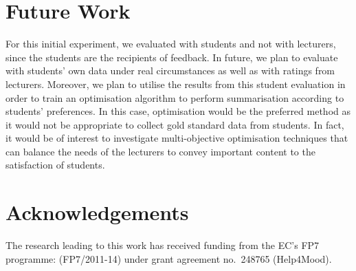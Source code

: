 \documentclass[11pt]{article}
\begin{document}
%




\section{Future Work} \label{futureWork} 

For this initial experiment, we evaluated with students and not with lecturers, since 
the students are the recipients of feedback. In future, we plan to evaluate with students' own 
data under real circumstances as well as with ratings from lecturers. 
Moreover, we plan to utilise the results from this student evaluation in order to train 
an optimisation algorithm to perform summarisation according to
students' preferences.  In this case, optimisation would be the
preferred method as it would not be appropriate to collect gold
standard data from students. In fact, it would be of interest to investigate 
multi-objective optimisation techniques that can balance the needs of
the lecturers to convey important content to the satisfaction of students. 






\section{Acknowledgements}
The research leading to this work has received funding from the
EC's FP7 programme: (FP7/2011-14) under
grant agreement no.\ 248765 ({Help4Mood}).



\end{document}
